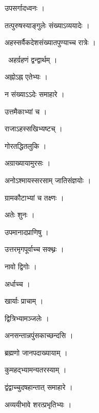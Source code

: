 \documentclass[10pt, openany, oneside]{book}
\begin{document}
\noindent उपसर्गादध्वनः ।

\noindent तत्पुरुषस्याङ्गुलेः संख्याऽव्ययादेः ।

\noindent अहस्सर्वैकदेशसंख्यातपुण्याच्च रात्रेः ।

\par\noindent\hspace{1.5em}{\vps वा॰}~{\qt अहर्ग्रहणं द्वन्द्वार्थम् ।}

\noindent अह्नोऽह्न एतेभ्यः ।

\noindent न संख्याऽऽदेः समाहारे ।

\noindent उत्तमैकाभ्यां च ।

\noindent राजाऽहस्सखिभ्यष्टच् ।

\noindent गोरतद्धितलुकि ।

\noindent अग्राख्यायामुरसः ।

\noindent अनोऽश्मायस्सरसाम् जातिसंज्ञयोः ।

\noindent ग्रामकौटाभ्यां च तक्ष्णः ।

\noindent अतेः शुनः ।

\noindent उपमानादप्राणिषु ।

\noindent उत्तरमृगपूर्वाच्च सक्थ्नः ।

\noindent नावो द्विगोः ।

\noindent अर्धाच्च ।

\noindent खार्याः प्राचाम् ।

\noindent द्वित्रिभ्यामञ्जलेः ।

\noindent अनसन्तान्नपुंसकाच्छन्दसि ।

\noindent ब्रह्मणो जानपदाख्यायाम् ।

\noindent कुमहद्भ्यामन्यतरस्याम् ।

\noindent द्वंद्वाच्चुदषहान्तात् समाहारे ।

\noindent अव्ययीभावे शरत्प्रभृतिभ्यः ।
\end{document}
